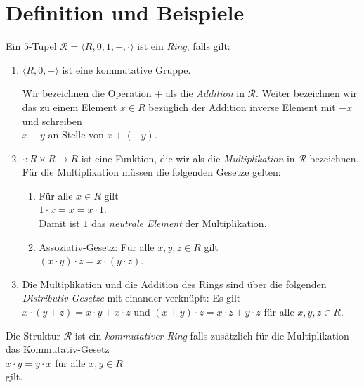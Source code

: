 \section{Definition und Beispiele}
\begin{Definition}[Ring]
Ein $5$-Tupel $\mathcal{R} = \langle R, 0, 1, +, \cdot \rangle$ ist ein \emph{\color{blue}Ring}, falls gilt:
\begin{enumerate}
\item $\langle R, 0, + \rangle$ ist eine kommutative Gruppe.
 
      Wir bezeichnen die Operation $+$ als die \emph{\color{blue}Addition} in $\mathcal{R}$.
      Weiter bezeichnen wir das zu einem Element $x \in R$ bez\"uglich der Addition 
      inverse Element mit $-x$ und schreiben
      \\[0.2cm]
      \hspace*{1.3cm}
      $x - y$ \quad an Stelle von $x + (-y)$.
\item $\cdot: R \times R \rightarrow R$ ist eine Funktion, die wir als die \emph{\color{blue}Multiplikation} in $\mathcal{R}$ bezeichnen.
      F\"{u}r die Multiplikation m\"ussen die folgenden Gesetze gelten:
      \begin{enumerate}
      \item F\"ur alle $x \in R$ gilt
            \\[0.2cm]
            \hspace*{1.3cm}
            $1 \cdot x = x = x \cdot 1$.
            \\[0.2cm]
            Damit ist $1$ das \emph{\color{blue}neutrale Element} der Multiplikation.
      \item Assoziativ-Gesetz:  F\"{u}r alle $x, y,z \in R$ gilt
            \\[0.2cm]
            \hspace*{1.3cm}
            $(x \cdot y) \cdot z = x \cdot (y \cdot z)$.
      \end{enumerate}
\item Die Multiplikation und die Addition des Rings sind \"uber die folgenden
      \emph{\color{blue}Distributiv-Gesetze} mit einander verkn\"upft:  Es gilt 
      \\[0.2cm]
      \hspace*{1.3cm} 
      $x \cdot (y + z) = x \cdot y + x \cdot z$ \quad und \quad
      $(x + y) \cdot z = x \cdot z + y \cdot z$ \quad f\"{u}r alle $x, y,z \in R$.
\end{enumerate}
Die Struktur $\mathcal{R}$ ist ein {\color{blue}\emph{kommutativer Ring}} falls zus\"{a}tzlich f\"{u}r die Multiplikation
das Kommutativ-Gesetz
\\[0.2cm]
\hspace*{1.3cm}
$x \cdot y = y \cdot x$ \quad f\"{u}r alle $x,y \in R$
\\[0.2cm]
gilt.  
\eoxs
\end{Definition}

